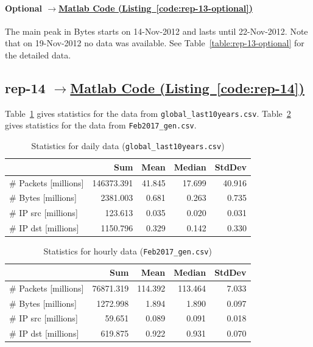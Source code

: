 \documentclass{article}
\newcommand{\codelink}[1]{%
    \hyperref[#1]{\quad$\rightarrow$\enskip Matlab Code (Listing~\ref{#1})}%
}
\begin{document}
\paragraph{Optional \codelink{code:rep-13-optional}}

The main peak in Bytes starts on 14-Nov-2012 and lasts until 22-Nov-2012. Note that
on 19-Nov-2012 no data was available. See Table~\ref{table:rep-13-optional}
for the detailed data.

\subsection{rep-14 \codelink{code:rep-14}}

Table~\ref{table:rep-14-daily} gives statistics for the data from
\texttt{global\_last10years.csv}. Table~\ref{table:rep-14-hourly} gives
statistics for the data from \texttt{Feb2017\_gen.csv}.

\begin{table}[H]
    \centering
    \begin{tabular}{l|rrrr}
                & Sum & Mean & Median & StdDev \\
                \hline
        \# Packets [millions] &   146373.391 & 41.845 & 17.699 & 40.916 \\
        \# Bytes [millions]   &    2381.003 & 0.681 & 0.263 & 0.735 \\
        \# IP src [millions]     & 123.613 & 0.035 & 0.020 & 0.031 \\
        \# IP dst  [millions]    & 1150.796 & 0.329 & 0.142 & 0.330 \\
    \end{tabular}
    \caption{\label{table:rep-14-daily} Statistics for daily data (\texttt{global\_last10years.csv})}
\end{table}

\begin{table}[H]
    \centering
    \begin{tabular}{l|rrrr}
                & Sum & Mean & Median & StdDev \\
                \hline
        \# Packets [millions] &    76871.319 & 114.392 & 113.464 & 7.033 \\
        \# Bytes  [millions]  &    1272.998  &1.894 & 1.890 & 0.097      \\
        \# IP src  [millions]    & 59.651 & 0.089 & 0.091 & 0.018        \\
        \# IP dst   [millions]   & 619.875 & 0.922 & 0.931 & 0.070       \\
    \end{tabular}
    \caption{\label{table:rep-14-hourly} Statistics for hourly data (\texttt{Feb2017\_gen.csv})}
\end{table}
\end{document}
